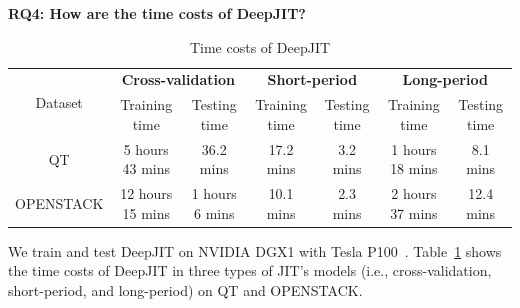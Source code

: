 \noindent \textbf{RQ4: How are the time costs of DeepJIT?}
\begin{table}[t!]
  \centering
  \caption{Time costs of DeepJIT}
    \begin{tabular}{|c|c|c|c|c|c|c|}
    \hline
    \multicolumn{1}{|c|}{\multirow{2}[4]{*}{Dataset}} & \multicolumn{2}{c|}{\textbf{Cross-validation}} & \multicolumn{2}{c|}{\textbf{Short-period}} & \multicolumn{2}{c|}{\textbf{Long-period}} \\
\cline{2-7}          & Training time & Testing time & Training time & Testing time & Training time & Testing time \\
    \hline
    \hline
    QT    & 5 hours 43 mins & 36.2 mins & 17.2 mins & 3.2 mins & 1 hours 18 mins & 8.1 mins \\
    \hline
    OPENSTACK & 12 hours 15 mins & 1 hours 6 mins & 10.1 mins & 2.3 mins & 2 hours 37 mins & 12.4 mins \\
    \hline
    \end{tabular}%
  \label{tab:cost}%
\end{table}%

We train and test DeepJIT on NVIDIA DGX1 with Tesla P100~\cite{gawande2018scaling}. Table~\ref{tab:cost} shows the time costs of DeepJIT in three types of JIT's models (i.e., cross-validation, short-period, and long-period) on QT and OPENSTACK. 

